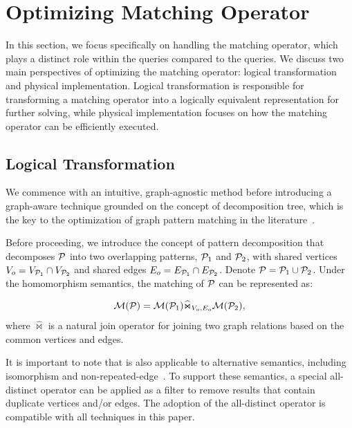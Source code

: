 
\section{Optimizing Matching Operator}
In this section, we focus specifically on handling the matching operator, which plays a distinct role
within the \spjm queries compared to the \spj queries. We discuss two main perspectives of optimizing
the matching operator: logical transformation and physical implementation. Logical transformation is
responsible for transforming a matching operator into a logically equivalent representation for further solving,
while physical implementation focuses on how the matching operator can be efficiently executed.

\subsection{Logical Transformation}
\label{sec:handling-match-operator}
We commence with an intuitive, graph-agnostic method before
introducing a graph-aware technique grounded on the concept of decomposition tree, which
is the key to the optimization of graph pattern matching in the literature~\cite{huge,GLogS}.

Before proceeding, we introduce the concept of pattern decomposition that decomposes $\mathcal{P}$ into two overlapping patterns, $\mathcal{P}_1$ and $\mathcal{P}_2$, with shared vertices $V_{o} = V_{\mathcal{P}_1} \cap V_{\mathcal{P}_2}$ and shared edges $E_{o} = E_{\mathcal{P}_1} \cap E_{\mathcal{P}_2}$.
Denote $\mathcal{P} = \mathcal{P}_1 \cup \mathcal{P}_2$. Under the homomorphism semantics, the matching of $\mathcal{P}$ can be represented as:

\begin{equation}
    \label{eq:join-pattern}
    \mathcal{M}(\mathcal{P}) = \mathcal{M}(\mathcal{P}_1) \widehat{\Join}_{V_{o}, E_{o}} \mathcal{M}(\mathcal{P}_2),
\end{equation}
where $\widehat{\Join}$ is a natural join operator for joining two graph relations based on the common vertices and edges.

It is important to note that  is also applicable to alternative semantics, including isomorphism and non-repeated-edge~\cite{angles2017foundations}. To support these semantics, a special all-distinct operator can be applied as a filter to remove results that contain duplicate vertices and/or edges. The adoption of the all-distinct operator is compatible with all techniques in this paper.


